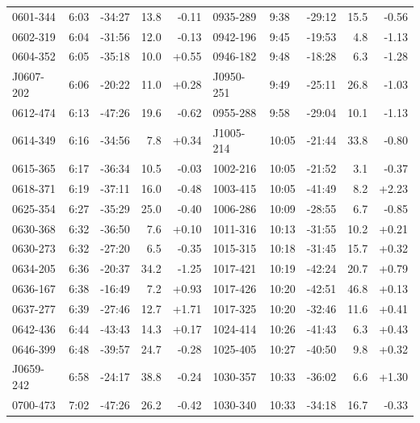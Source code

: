 \documentclass[preprint]{aastex}
\begin{document}
\begin{table}[ht]
\begin{tabular}{l|lrrr||l|lrrr}
  0601-344 &  6:03 & -34:27 &   13.8 & -0.11 &   0935-289 &  9:38 & -29:12 &   15.5 & -0.56 \\
  0602-319 &  6:04 & -31:56 &   12.0 & -0.13 &   0942-196 &  9:45 & -19:53 &    4.8 & -1.13 \\
  0604-352 &  6:05 & -35:18 &   10.0 & +0.55 &   0946-182 &  9:48 & -18:28 &    6.3 & -1.28 \\
 J0607-202 &  6:06 & -20:22 &   11.0 & +0.28 &  J0950-251 &  9:49 & -25:11 &   26.8 & -1.03 \\
  0612-474 &  6:13 & -47:26 &   19.6 & -0.62 &   0955-288 &  9:58 & -29:04 &   10.1 & -1.13 \\
  0614-349 &  6:16 & -34:56 &    7.8 & +0.34 &  J1005-214 & 10:05 & -21:44 &   33.8 & -0.80 \\
  0615-365 &  6:17 & -36:34 &   10.5 & -0.03 &   1002-216 & 10:05 & -21:52 &    3.1 & -0.37 \\
  0618-371 &  6:19 & -37:11 &   16.0 & -0.48 &   1003-415 & 10:05 & -41:49 &    8.2 & +2.23 \\
  0625-354 &  6:27 & -35:29 &   25.0 & -0.40 &   1006-286 & 10:09 & -28:55 &    6.7 & -0.85 \\
  0630-368 &  6:32 & -36:50 &    7.6 & +0.10 &   1011-316 & 10:13 & -31:55 &   10.2 & +0.21 \\
  0630-273 &  6:32 & -27:20 &    6.5 & -0.35 &   1015-315 & 10:18 & -31:45 &   15.7 & +0.32 \\
  0634-205 &  6:36 & -20:37 &   34.2 & -1.25 &   1017-421 & 10:19 & -42:24 &   20.7 & +0.79 \\
  0636-167 &  6:38 & -16:49 &    7.2 & +0.93 &   1017-426 & 10:20 & -42:51 &   46.8 & +0.13 \\
  0637-277 &  6:39 & -27:46 &   12.7 & +1.71 &   1017-325 & 10:20 & -32:46 &   11.6 & +0.41 \\
  0642-436 &  6:44 & -43:43 &   14.3 & +0.17 &   1024-414 & 10:26 & -41:43 &    6.3 & +0.43 \\
  0646-399 &  6:48 & -39:57 &   24.7 & -0.28 &   1025-405 & 10:27 & -40:50 &    9.8 & +0.32 \\
 J0659-242 &  6:58 & -24:17 &   38.8 & -0.24 &   1030-357 & 10:33 & -36:02 &    6.6 & +1.30 \\
  0700-473 &  7:02 & -47:26 &   26.2 & -0.42 &   1030-340 & 10:33 & -34:18 &   16.7 & -0.33 \\
\hline
\end{tabular}
\end{table}
\end{document}
